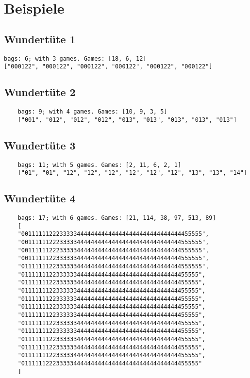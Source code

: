 \section{Beispiele}
\subsection{Wundertüte 1}
\begin{verbatim}
bags: 6; with 3 games. Games: [18, 6, 12]
["000122", "000122", "000122", "000122", "000122", "000122"]
\end{verbatim}

\subsection{Wundertüte 2}
\begin{verbatim}
    bags: 9; with 4 games. Games: [10, 9, 3, 5]
    ["001", "012", "012", "012", "013", "013", "013", "013", "013"]    
\end{verbatim}

\subsection{Wundertüte 3}
\begin{verbatim}
    bags: 11; with 5 games. Games: [2, 11, 6, 2, 1]
    ["01", "01", "12", "12", "12", "12", "12", "12", "13", "13", "14"]    
\end{verbatim}

\subsection{Wundertüte 4}
\begin{verbatim}
    bags: 17; with 6 games. Games: [21, 114, 38, 97, 513, 89]
    [
    "0011111122233333444444444444444444444444444444455555",
    "0011111122233333444444444444444444444444444444555555",
    "0011111122233333444444444444444444444444444444555555",
    "0011111122333333444444444444444444444444444444555555",
    "0111111122333333444444444444444444444444444444555555", 
    "011111112233333344444444444444444444444444444455555",
    "011111112233333344444444444444444444444444444455555",
    "011111112233333344444444444444444444444444444455555",
    "011111112233333344444444444444444444444444444455555",
    "011111112233333344444444444444444444444444444455555",
    "011111112233333344444444444444444444444444444455555",
    "011111112233333344444444444444444444444444444455555",
    "011111112233333344444444444444444444444444444455555",
    "011111112233333344444444444444444444444444444455555",
    "011111112233333344444444444444444444444444444455555",
    "011111112233333444444444444444444444444444444455555",
    "011111122233333444444444444444444444444444444455555"
    ]    
\end{verbatim}


